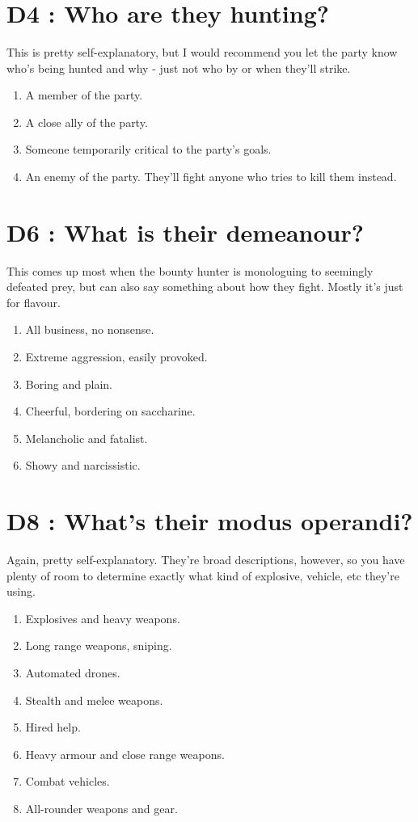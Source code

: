 \documentclass{article}
\begin{document}
\title{\vspace{-0.5cm}{\Huge One Roll Bounty Hunter} \vspace{-1cm}}

\date{}

\maketitle

\section*{D4 : Who are they hunting?}
This is pretty self-explanatory, but I would recommend you let the party know who's being hunted and why - just not who by or when they'll strike.
\begin{enumerate}
	\item A member of the party.
	\item A close ally of the party.
	\item Someone temporarily critical to the party's goals.
	\item An enemy of the party. They'll fight anyone who tries to kill them instead.
\end{enumerate}

\section*{D6 : What is their demeanour?}
This comes up most when the bounty hunter is monologuing to seemingly defeated prey, but can also say something about how they fight. Mostly it's just for flavour.
\begin{enumerate}
	\item All business, no nonsense.
	\item Extreme aggression, easily provoked.
	\item Boring and plain.
	\item Cheerful, bordering on saccharine.
	\item Melancholic and fatalist.
	\item Showy and narcissistic.
\end{enumerate}

\section*{D8 : What's their modus operandi?}
Again, pretty self-explanatory. They're broad descriptions, however, so you have plenty of room to determine exactly what kind of explosive, vehicle, etc they're using.
\begin{enumerate}
	\item Explosives and heavy weapons.
	\item Long range weapons, sniping.
	\item Automated drones.
	\item Stealth and melee weapons.
	\item Hired help.
	\item Heavy armour and close range weapons.
	\item Combat vehicles.
	\item All-rounder weapons and gear.
\end{enumerate}
\end{document}
